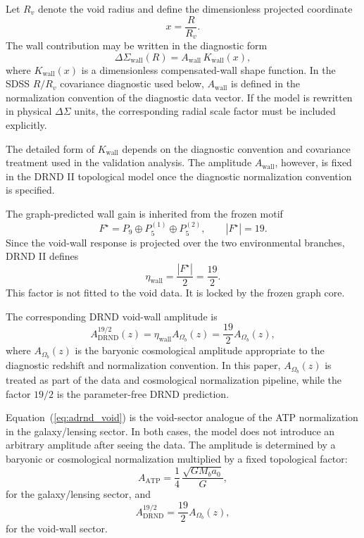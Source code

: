 \documentclass[12pt]{iopart}
\begin{document}
Let \(R_v\) denote the void radius and define the dimensionless projected coordinate
\begin{equation}
x=\frac{R}{R_v}.
\end{equation}
The wall contribution may be written in the diagnostic form
\begin{equation}
\Delta\Sigma_{\mathrm{wall}}(R)
=
A_{\mathrm{wall}}\,K_{\mathrm{wall}}(x),
\label{eq:wall_kernel}
\end{equation}
where \(K_{\mathrm{wall}}(x)\) is a dimensionless compensated-wall shape function. In the SDSS \(R/R_v\) covariance diagnostic used below, \(A_{\mathrm{wall}}\) is defined in the normalization convention of the diagnostic data vector. If the model is rewritten in physical \(\Delta\Sigma\) units, the corresponding radial scale factor must be included explicitly.

The detailed form of \(K_{\mathrm{wall}}\) depends on the diagnostic convention and covariance treatment used in the validation analysis. The amplitude \(A_{\mathrm{wall}}\), however, is fixed in the DRND II topological model once the diagnostic normalization convention is specified.

The graph-predicted wall gain is inherited from the frozen motif
\begin{equation}
F^\star=P_9\oplus P_5^{(1)}\oplus P_5^{(2)},
\qquad |F^\star|=19.
\end{equation}
Since the void-wall response is projected over the two environmental branches, DRND II defines
\begin{equation}
\eta_{\mathrm{wall}}
=
\frac{|F^\star|}{2}
=
\frac{19}{2}.
\label{eq:eta_wall}
\end{equation}
This factor is not fitted to the void data. It is locked by the frozen graph core.

The corresponding DRND void-wall amplitude is
\begin{equation}
A_{\mathrm{DRND}}^{19/2}(z)
=
\eta_{\mathrm{wall}}A_{\Omega_b}(z)
=
\frac{19}{2}A_{\Omega_b}(z),
\label{eq:adrnd_void}
\end{equation}
where \(A_{\Omega_b}(z)\) is the baryonic cosmological amplitude appropriate to the diagnostic redshift and normalization convention. In this paper, \(A_{\Omega_b}(z)\) is treated as part of the data and cosmological normalization pipeline, while the factor \(19/2\) is the parameter-free DRND prediction.

Equation~(\ref{eq:adrnd_void}) is the void-sector analogue of the ATP normalization in the galaxy/lensing sector. In both cases, the model does not introduce an arbitrary amplitude after seeing the data. The amplitude is determined by a baryonic or cosmological normalization multiplied by a fixed topological factor:
\begin{equation}
A_{\mathrm{ATP}}
=
\frac14\,\frac{\sqrt{GM_ba_0}}{G},
\end{equation}
for the galaxy/lensing sector, and
\begin{equation}
A_{\mathrm{DRND}}^{19/2}
=
\frac{19}{2}A_{\Omega_b}(z),
\end{equation}
for the void-wall sector.
\end{document}
